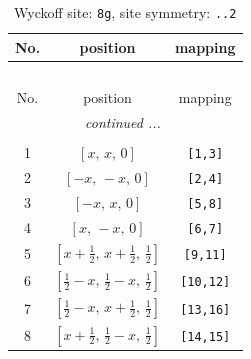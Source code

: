 \documentclass[fleqn,8pt]{jsarticle}
\begin{document}
\renewcommand{\arraystretch}{1.2}
\begin{longtable}{ccc}
\caption{Wyckoff site: {\tt 8g}, site symmetry: {\tt ..2}}
 \\
 \hline \hline
No. & position & mapping \\ \hline \endfirsthead

\multicolumn{2}{l}{\tablename\ \thetable{}} \\
 \hline \hline
No. & position & mapping \\ \hline \endhead

 \hline \hline
\multicolumn{2}{r}{\footnotesize\it continued ...} \\ \endfoot

 \hline \hline
\multicolumn{2}{r}{} \\ \endlastfoot

1 & $\left[ x,\, x,\, 0 \right]$ & {\tt [1,3]} \\ \hline
2 & $\left[ - x,\, - x,\, 0 \right]$ & {\tt [2,4]} \\ \hline
3 & $\left[ - x,\, x,\, 0 \right]$ & {\tt [5,8]} \\ \hline
4 & $\left[ x,\, - x,\, 0 \right]$ & {\tt [6,7]} \\ \hline
5 & $\left[ x + \frac{1}{2},\, x + \frac{1}{2},\, \frac{1}{2} \right]$ & {\tt [9,11]} \\ \hline
6 & $\left[ \frac{1}{2} - x,\, \frac{1}{2} - x,\, \frac{1}{2} \right]$ & {\tt [10,12]} \\ \hline
7 & $\left[ \frac{1}{2} - x,\, x + \frac{1}{2},\, \frac{1}{2} \right]$ & {\tt [13,16]} \\ \hline
8 & $\left[ x + \frac{1}{2},\, \frac{1}{2} - x,\, \frac{1}{2} \right]$ & {\tt [14,15]} \\
\end{longtable}
\renewcommand{\arraystretch}{1.2}
\end{document}
